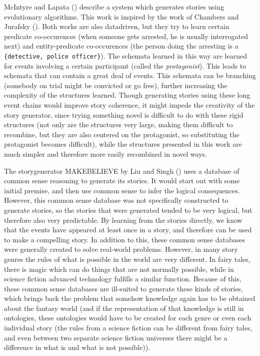 McIntyre and Lapata (\cite{McIntyre2010}) describe a system which
generates stories using evolutionary algorithms. This work is inspired by the
work of Chambers and Jurafsky (\cite{chambers2009unsupervised}). Both works are
also datadriven, but they try to learn certain predicate co-occurences (when someone
gets arrested, he is usually interrogated next) and entity-predicate
co-occurences (the person doing the arresting is a \texttt{\{detective, police
officer\}}). The schemata learned in this way are learned for events involving a
certain participant (called the \emph{protagonist}). This leads to schemata that
can contain a great deal of events. This schemata can be branching (somebody on trial
might be convicted or go free), further increasing the complexity of the
structures learned.
Though generating stories using these long event chains would improve story coherence,
it might impede the creativity of the story generator, since trying something novel is
difficult to do with these rigid structures (not only are the structures very
large, making them difficult to recombine, but they are also centered on the
protagonist, so substituting the protagonist becomes difficult), while the structures presented in
this work are much simpler and therefore more easily recombined in novel ways.

The storygenerator MAKEBELIEVE by Liu and Singh (\cite{liu2002makebelieve}) uses
a database of common sense reasoning to generate its stories. It would start out
with some initial premise, and then use common sense to infer the logical
consequences. However, this common sense
database was not specifically constructed to generate stories, so the stories
that were generated tended to be very logical, but therefore also very
predictable. By
learning from the stories directly, we know that the events have appeared at
least once in a story, and therefore can be used to make a compelling story.
In addition to this, these common sense databases were generally created to
solve real-world problems. However, in many story genres
the rules of what is possible in the world are very different. In fairy tales,
there is magic which can do things that are not normally possible, while in science fiction
advanced technology fulfills a similar function. Because of this, these common sense
databases are ill-suited to generate these kinds of stories, which brings back
the problem that somehow knowledge again has to be obtained about the fantasy
world (and if the representation of that knowledge is still in ontologies,
these ontologies would have to be created for each genre or even each individual
story (the rules from a science fiction can be different from fairy tales, and
even between two separate science fiction universes there might be a difference
in what is and what is not possible)).

